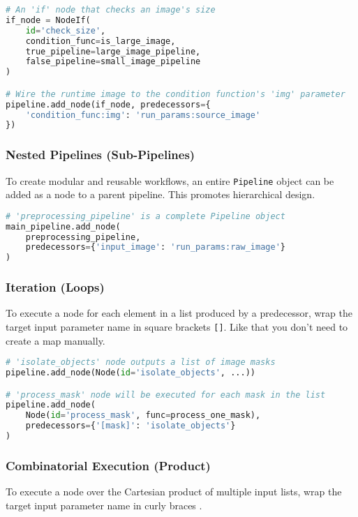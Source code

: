 \documentclass[12pt]{article}
\begin{document}
\begin{lstlisting}[language=python, caption={Using NodeIf for conditional logic}]
# An 'if' node that checks an image's size
if_node = NodeIf(
    id='check_size',
    condition_func=is_large_image,
    true_pipeline=large_image_pipeline,
    false_pipeline=small_image_pipeline
)

# Wire the runtime image to the condition function's 'img' parameter
pipeline.add_node(if_node, predecessors={
    'condition_func:img': 'run_params:source_image'
})
\end{lstlisting}

\subsubsection{Nested Pipelines (Sub-Pipelines)}
To create modular and reusable workflows, an entire \texttt{Pipeline} object can be added as a node to a parent pipeline. This promotes hierarchical design.

\begin{lstlisting}[language=python, caption={Adding a pipeline as a sub-pipeline}]
# 'preprocessing_pipeline' is a complete Pipeline object
main_pipeline.add_node(
    preprocessing_pipeline,
    predecessors={'input_image': 'run_params:raw_image'}
)
\end{lstlisting}

\subsubsection{Iteration (Loops)}
To execute a node for each element in a list produced by a predecessor, wrap the target input parameter name in square brackets \texttt{[]}. Like that you don't need to create a map manually.

\begin{lstlisting}[language=python, caption={Iterating over a list of elements}]
# 'isolate_objects' node outputs a list of image masks
pipeline.add_node(Node(id='isolate_objects', ...))

# 'process_mask' node will be executed for each mask in the list
pipeline.add_node(
    Node(id='process_mask', func=process_one_mask),
    predecessors={'[mask]': 'isolate_objects'}
)
\end{lstlisting}

\subsubsection{Combinatorial Execution (Product)}
To execute a node over the Cartesian product of multiple input lists, wrap the target input parameter name in curly braces \texttt{{}}.
\end{document}
